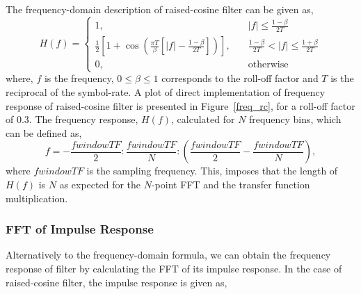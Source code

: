 \documentclass[a4paper]{article}
\begin{document}
The frequency-domain description of raised-cosine filter can be given as,
$$
H(f) = \left\{
    \begin{array}{ll}
        1,       & \quad \left|f\right| \leq \frac{1-\beta}{2T} \\
    \frac{1}{2}\left[ 1+\cos\left(\frac{\pi T}{\beta}\left[\left|f\right| - \frac{1-\beta}{2T}\right]\right)\right],  & \quad \frac{1-\beta}{2T} < \left|f\right| \leq \frac{1+\beta}{2T}\\
    0, & \quad \text{otherwise}
    \end{array}
\right.
$$
where, $f$ is the frequency, $0 \leq \beta \leq 1$ corresponds to the roll-off factor and $T$ is the reciprocal of the symbol-rate.
A plot of direct implementation of frequency response of raised-cosine filter is presented in Figure~\ref{freq_rc}, for a roll-off factor of 0.3.
The frequency response, $H(f)$, calculated for $N$ frequency bins, which can be defined as,
\begin{equation}
    f= -\frac{fwindowTF}{2}:\frac{fwindowTF}{N}:\left(\frac{fwindowTF}{2}-\frac{fwindowTF}{N}\right),
    \label{freq}
\end{equation}
where $fwindowTF$ is the sampling frequency. This, imposes that the length of $H(f)$ is $N$ as expected for the $N$-point FFT and the transfer function multiplication.
\subsubsection{FFT of Impulse Response}
Alternatively to the frequency-domain formula, we can obtain the frequency response of filter by calculating the FFT of its impulse response. In the case of raised-cosine filter, the impulse response is given as,
\end{document}
